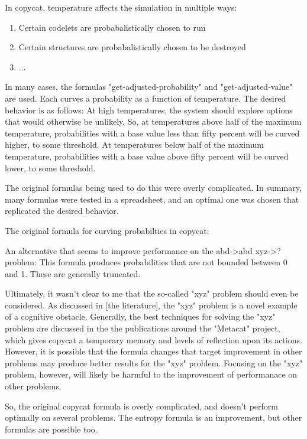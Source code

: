 \documentclass[a4paper]{article}
\begin{document}
In copycat, temperature affects the simulation in multiple ways:

\begin{enumerate}
    \item Certain codelets are probabalistically chosen to run
    \item Certain structures are probabalistically chosen to be destroyed
    \item ...
\end{enumerate}

In many cases, the formulas "get-adjusted-probability" and "get-adjusted-value" are used.
Each curves a probability as a function of temperature.
The desired behavior is as follows:
At high temperatures, the system should explore options that would otherwise be unlikely.
So, at temperatures above half of the maximum temperature, probabilities with a base value less than fifty percent will be curved higher, to some threshold.
At temperatures below half of the maximum temperature, probabilities with a base value above fifty percent will be curved lower, to some threshold.

The original formulas being used to do this were overly complicated.
In summary, many formulas were tested in a spreadsheet, and an optimal one was chosen that replicated the desired behavior.

The original formula for curving probabilties in copycat:


An alternative that seems to improve performance on the abd->abd xyz->? problem:
This formula produces probabilities that are not bounded between 0 and 1. These are generally truncated.


Ultimately, it wasn't clear to me that the so-called "xyz" problem should even be considered.
As discussed in [the literature], the "xyz" problem is a novel example of a cognitive obstacle. 
Generally, the best techniques for solving the "xyz" problem are discussed in the the publications around the "Metacat" project, which gives copycat a temporary memory and levels of reflection upon its actions.
However, it is possible that the formula changes that target improvement in other problems may produce better results for the "xyz" problem.
Focusing on the "xyz" problem, however, will likely be harmful to the improvement of performanace on other problems.

So, the original copycat formula is overly complicated, and doesn't perform optimally on several problems.
The entropy formula is an improvement, but other formulas are possible too.
\end{document}
